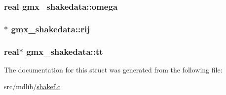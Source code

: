 \hypertarget{structgmx__shakedata_a2142ed7ecfd17f65fff57e6b49068934}{
\subsubsection[{omega}]{\setlength{\rightskip}{0pt plus 5cm}real {\bf gmx\-\_\-shakedata\-::omega}}}\label{structgmx__shakedata_a2142ed7ecfd17f65fff57e6b49068934}
\hypertarget{structgmx__shakedata_a6253656af9ec145464c89c0da4f411cc}{
\subsubsection[{rij}]{$\ast$ {\bf gmx\-\_\-shakedata\-::rij}}}\label{structgmx__shakedata_a6253656af9ec145464c89c0da4f411cc}
\hypertarget{structgmx__shakedata_a666a546766fa59269ebbdde5987780f1}{
\subsubsection[{tt}]{\setlength{\rightskip}{0pt plus 5cm}real$\ast$ {\bf gmx\-\_\-shakedata\-::tt}}}\label{structgmx__shakedata_a666a546766fa59269ebbdde5987780f1}


\-The documentation for this struct was generated from the following file\-:\begin{DoxyCompactItemize}
\item 
src/mdlib/\hyperlink{shakef_8c}{shakef.\-c}\end{DoxyCompactItemize}
